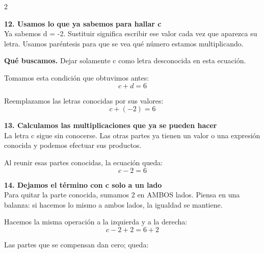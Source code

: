 \documentclass[11pt,a4paper,landscape]{article}
\begin{document}
\begin{multicols*}{2}
\begin{minipage}{\linewidth}
\end{minipage}\par\medskip
\noindent\begin{minipage}{\linewidth}\textbf{12. Usamos lo que ya sabemos para hallar c}\\[2pt]Ya sabemos d = -2. Sustituir significa escribir ese valor cada vez que aparezca su letra. Usamos paréntesis para que se vea qué número estamos multiplicando.
\par\smallskip\textbf{Qué buscamos.} Dejar solamente c como letra desconocida en esta ecuación.
\par\smallskip Tomamos esta condición que obtuvimos antes:
\[c + d = 6\]
\par\smallskip Reemplazamos las letras conocidas por sus valores:
\[c + \left(-2\right)=6\]
\end{minipage}\par\medskip
\noindent\begin{minipage}{\linewidth}\textbf{13. Calculamos las multiplicaciones que ya se pueden hacer}\\[2pt]La letra c sigue sin conocerse. Las otras partes ya tienen un valor o una expresión conocida y podemos efectuar sus productos.
\par{}\par\smallskip
\par\smallskip Al reunir esas partes conocidas, la ecuación queda:
\[c - 2=6\]
\end{minipage}\par\medskip
\noindent\begin{minipage}{\linewidth}\textbf{14. Dejamos el término con c solo a un lado}\\[2pt]Para quitar la parte conocida, sumamos 2 en AMBOS lados. Piensa en una balanza: si hacemos lo mismo a ambos lados, la igualdad se mantiene.
\par\smallskip Hacemos la misma operación a la izquierda y a la derecha:
\[c - 2 + 2=6 + 2\]
\par\smallskip Las partes que se compensan dan cero; queda:

\end{minipage}
\end{multicols*}
\end{document}
